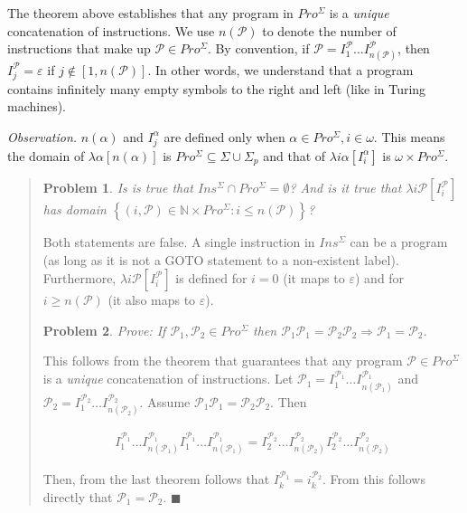 \documentclass[a4paper, 12pt]{article}
\newtheorem{problem}{Problem}
\newtheorem{problem}{Problem}
\begin{document}
The theorem above establishes that any program in $Pro^{\Sigma}$ is a
\textit{unique} concatenation of instructions. We use $n(\mathcal{P})$ to denote
the number of instructions that make up $\mathcal{P} \in Pro^{\Sigma}$. By
convention, if $\mathcal{P} = I^{\mathcal{P}}_1 \ldots
I^{\mathcal{P}}_{n(\mathcal{P})}$, then $I^{\mathcal{P}}_j =
\varepsilon$ if $j \not\in [1, n(\mathcal{P})]$. In other words, we understand that
a program contains infinitely many empty symbols to the right and left (like in
Turing machines).

\textit{Observation.} $n(\alpha)$ and $I_j^{\alpha}$ are defined only when
$\alpha \in Pro^{\Sigma}, i \in \omega$. This means the domain of $\lambda
\alpha[n(\alpha)]$ is $Pro^{\Sigma} \subseteq \Sigma \cup \Sigma_p$ and that of
$\lambda i\alpha[I_i^{\alpha}]$ is $\omega \times Pro^{\Sigma}$.


\small
\begin{quote}


\begin{problem}
    Is is true that $Ins^{\Sigma} \cap Pro^{\Sigma} = \emptyset$? And is it true
    that $\lambda i \mathcal{P} [I_i^{\mathcal{P}}]$ has domain $\left\{ (i,
    \mathcal{P}) \in \mathbb{N} \times Pro^{\Sigma}: i \leq n(\mathcal{P})
\right\} $?
\end{problem}

Both statements are false. A single instruction in $Ins^{\Sigma}$ can be a
program (as long as it is not a GOTO statement to a non-existent label).
Furthermore, $\lambda i \mathcal{P} [I_i^{\mathcal{P}}]$ is defined for $i = 0$
(it maps to $\varepsilon$) and for $i \geq n(\mathcal{P} )$ (it also maps to
$\varepsilon$).

\begin{problem}
    Prove: If $\mathcal{P}_1, \mathcal{P}_2 \in Pro^{\Sigma}$ then $\mathcal{P}_1
    \mathcal{P}_1 = \mathcal{P}_2 \mathcal{P}_2 \Rightarrow \mathcal{P}_1 =
    \mathcal{P}_2$.
\end{problem}

This follows from the theorem that guarantees that any program $\mathcal{P} \in
Pro^{\Sigma}$ is a \textit{unique} concatenation of instructions. Let
$\mathcal{P}_1 = I_1^{\mathcal{P}_1} \ldots I_{n(\mathcal{P}_1)}^{\mathcal{P}_1}$ and $\mathcal{P}_2 = I_1^{\mathcal{P}_2}
\ldots I_{n(\mathcal{P}_2)}^{\mathcal{P}_2}$. Assume $\mathcal{P}_1\mathcal{P}_1 =
\mathcal{P}_2 \mathcal{P}_2$. Then 

\begin{align*}
    I_1^{\mathcal{P}_1} \ldots I_{n(\mathcal{P}_1)}^{\mathcal{P}_1}
    I_1^{\mathcal{P}_1} \ldots I_{n(\mathcal{P}_1)}^{\mathcal{P}_1} = 
    I_2^{\mathcal{P}_2} \ldots I_{n(\mathcal{P}_2)}^{\mathcal{P}_2}
    I_2^{\mathcal{P}_2} \ldots I_{n(\mathcal{P}_2)}^{\mathcal{P}_2}
\end{align*}

Then, from the last theorem follows that $I_k^{\mathcal{P}_1} =
i_k^{\mathcal{P}_2}$. From this follows directly that $\mathcal{P}_1 =
\mathcal{P}_2$. $\blacksquare$

\end{quote}
\normalsize
\end{document}
